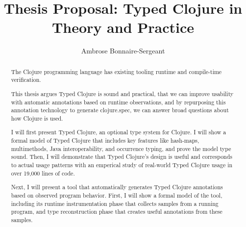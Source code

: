 \documentclass{article}
\title{Thesis Proposal: Typed Clojure in Theory and Practice}
\author{Ambrose Bonnaire-Sergeant}
\begin{document}
\maketitle

\begin{abstract}
The Clojure programming language has existing tooling runtime and compile-time
verification.

This thesis argues Typed Clojure is sound and practical,
that we can improve usability with automatic annotations based on runtime observations,
and by repurposing this annotation technology to generate clojure.spec,
we can answer broad questions about how Clojure is used.

I will first present Typed Clojure, an optional type system for Clojure.
I will show a formal model of Typed Clojure that includes
key features like hash-maps, multimethods, Java interoperability, and occurrence typing,
and prove the model type sound.
Then, I will demonstrate that Typed Clojure's design is useful and corresponds to actual usage patterns
with an emperical study of real-world Typed Clojure usage in over 19,000 lines of code.

Next, I will present a tool that automatically generates Typed Clojure annotations based on observed
program behavior.
First, I will show a formal model of the tool, including its runtime instrumentation phase that
collects samples from a running program, and type reconstruction phase
that creates useful annotations from these samples.
\end{abstract}




\end{document}
